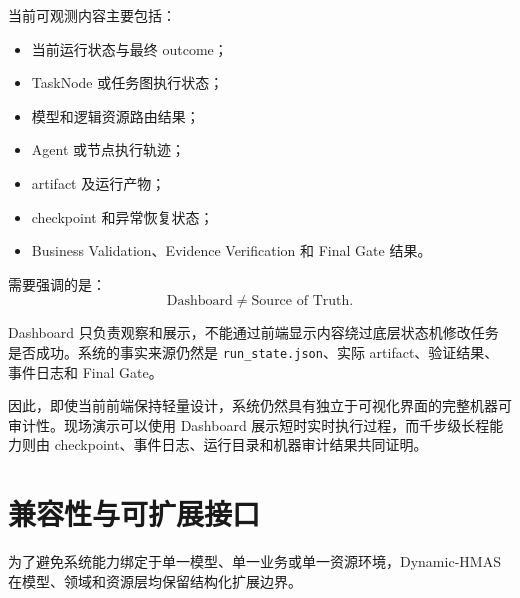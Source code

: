 \documentclass[UTF8,a4paper,12pt,oneside]{ctexbook}
\begin{document}
当前可观测内容主要包括：

\begin{itemize}
    \item 当前运行状态与最终 outcome；
    \item TaskNode 或任务图执行状态；
    \item 模型和逻辑资源路由结果；
    \item Agent 或节点执行轨迹；
    \item artifact 及运行产物；
    \item checkpoint 和异常恢复状态；
    \item Business Validation、Evidence Verification 和 Final Gate 结果。
\end{itemize}

需要强调的是：
\[
\text{Dashboard}
\neq
\text{Source of Truth}.
\]

Dashboard 只负责观察和展示，不能通过前端显示内容绕过底层状态机修改任务是否成功。系统的事实来源仍然是 \texttt{run\_state.json}、实际 artifact、验证结果、事件日志和 Final Gate。

因此，即使当前前端保持轻量设计，系统仍然具有独立于可视化界面的完整机器可审计性。现场演示可以使用 Dashboard 展示短时实时执行过程，而千步级长程能力则由 checkpoint、事件日志、运行目录和机器审计结果共同证明。


\section{兼容性与可扩展接口}

为了避免系统能力绑定于单一模型、单一业务或单一资源环境，Dynamic-HMAS 在模型、领域和资源层均保留结构化扩展边界。
\end{document}
